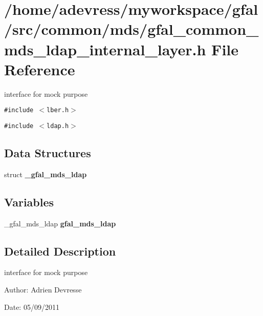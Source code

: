 \section{/home/adevress/myworkspace/gfal/src/common/mds/gfal\_\-common\_\-mds\_\-ldap\_\-internal\_\-layer.h File Reference}
\label{gfal__common__mds__ldap__internal__layer_8h}
interface for mock purpose 

{\tt \#include $<$lber.h$>$}\par
{\tt \#include $<$ldap.h$>$}\par
\subsection*{Data Structures}
\begin{CompactItemize}
\item 
struct \textbf{\_\-gfal\_\-mds\_\-ldap}
\end{CompactItemize}
\subsection*{Variables}
\begin{CompactItemize}
\item 
\_\-gfal\_\-mds\_\-ldap \textbf{gfal\_\-mds\_\-ldap}\label{gfal__common__mds__ldap__internal__layer_8h_99999266a714317665042e6bdca76d0f}

\end{CompactItemize}


\subsection{Detailed Description}
interface for mock purpose 

\begin{Desc}
\item[Author:]Adrien Devresse \end{Desc}
\begin{Desc}
\item[Date:]05/09/2011 \end{Desc}
